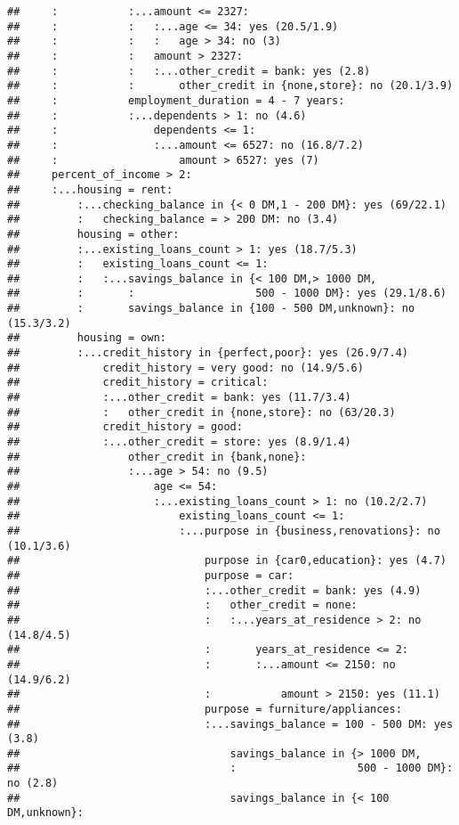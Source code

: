\documentclass[
]{article}
\begin{document}
\begin{verbatim}
##     :           :...amount <= 2327:
##     :           :   :...age <= 34: yes (20.5/1.9)
##     :           :   :   age > 34: no (3)
##     :           :   amount > 2327:
##     :           :   :...other_credit = bank: yes (2.8)
##     :           :       other_credit in {none,store}: no (20.1/3.9)
##     :           employment_duration = 4 - 7 years:
##     :           :...dependents > 1: no (4.6)
##     :               dependents <= 1:
##     :               :...amount <= 6527: no (16.8/7.2)
##     :                   amount > 6527: yes (7)
##     percent_of_income > 2:
##     :...housing = rent:
##         :...checking_balance in {< 0 DM,1 - 200 DM}: yes (69/22.1)
##         :   checking_balance = > 200 DM: no (3.4)
##         housing = other:
##         :...existing_loans_count > 1: yes (18.7/5.3)
##         :   existing_loans_count <= 1:
##         :   :...savings_balance in {< 100 DM,> 1000 DM,
##         :       :                   500 - 1000 DM}: yes (29.1/8.6)
##         :       savings_balance in {100 - 500 DM,unknown}: no (15.3/3.2)
##         housing = own:
##         :...credit_history in {perfect,poor}: yes (26.9/7.4)
##             credit_history = very good: no (14.9/5.6)
##             credit_history = critical:
##             :...other_credit = bank: yes (11.7/3.4)
##             :   other_credit in {none,store}: no (63/20.3)
##             credit_history = good:
##             :...other_credit = store: yes (8.9/1.4)
##                 other_credit in {bank,none}:
##                 :...age > 54: no (9.5)
##                     age <= 54:
##                     :...existing_loans_count > 1: no (10.2/2.7)
##                         existing_loans_count <= 1:
##                         :...purpose in {business,renovations}: no (10.1/3.6)
##                             purpose in {car0,education}: yes (4.7)
##                             purpose = car:
##                             :...other_credit = bank: yes (4.9)
##                             :   other_credit = none:
##                             :   :...years_at_residence > 2: no (14.8/4.5)
##                             :       years_at_residence <= 2:
##                             :       :...amount <= 2150: no (14.9/6.2)
##                             :           amount > 2150: yes (11.1)
##                             purpose = furniture/appliances:
##                             :...savings_balance = 100 - 500 DM: yes (3.8)
##                                 savings_balance in {> 1000 DM,
##                                 :                   500 - 1000 DM}: no (2.8)
##                                 savings_balance in {< 100 DM,unknown}:

\end{verbatim}
\end{document}

